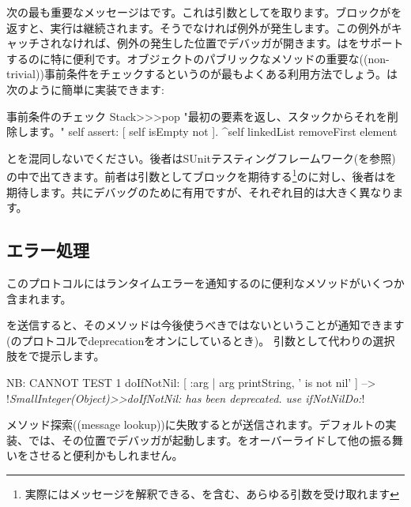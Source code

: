 \documentclass[a4paper,10pt,twoside]{book}
\begin{document}

次の最も重要なメッセージはです。これは引数としてを取ります。ブロックがを返すと、実行は継続されます。そうでなければ例外が発生します。この例外がキャッチされなければ、例外の発生した位置でデバッガが開きます。はをサポートするのに特に便利です。オブジェクトのパブリックなメソッドの重要な((non-trivial))事前条件をチェックするというのが最もよくある利用方法でしょう。は次のように簡単に実装できます:

\begin{method}{事前条件のチェック}
Stack>>>pop
    "最初の要素を返し、スタックからそれを削除します。"
    self assert: [ self isEmpty not ].
    ^self linkedList removeFirst element
\end{method}

とを混同しないでください。後者はSUnitテスティングフレームワーク(を参照)の中で出てきます。前者は引数としてブロックを期待する\footnote{実際にはメッセージを解釈できる、を含む、あらゆる引数を受け取れます}のに対し、後者はを期待します。共にデバッグのために有用ですが、それぞれ目的は大きく異なります。

\subsection{エラー処理}

このプロトコルにはランタイムエラーを通知するのに便利なメソッドがいくつか含まれます。

を送信すると、そのメソッドは今後使うべきではないということが通知できます(のプロトコルでdeprecationをオンにしているとき)。
引数として代わりの選択肢をで提示します。

\begin{code}{NB: CANNOT TEST}
1 doIfNotNil: [ :arg | arg printString, ' is not nil' ]
  --> !\emph{SmallInteger(Object)>>doIfNotNil: has been deprecated. use ifNotNilDo:}!
\end{code}

メソッド探索((message lookup))に失敗するとが送信されます。デフォルトの実装、\ie{}では、その位置でデバッガが起動します。をオーバーライドして他の振る舞いをさせると便利かもしれません。
\end{document}
